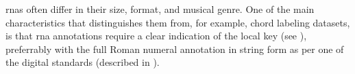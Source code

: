 
\glspl{rna} often  differ in their size, format, and musical
genre. One of the main characteristics that distinguishes
them from, for example, chord labeling datasets, is that
\gls{rna} annotations require a clear indication of the
local key (see ), preferrably with
the full Roman numeral annotation in string form as per one
of the digital standards (described in
).